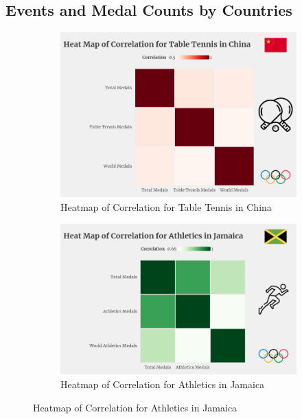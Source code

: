 \documentclass[12pt]{article}  %
\begin{document}
\subsection{Events and Medal Counts by Countries}





\begin{figure}[htbp]
	\centering
	\begin{subfigure}[b]{.3\textwidth}
		\includegraphics[width=\textwidth]{img/Table Tennis.png}
		\caption{Heatmap of Correlation for Table Tennis in China}\label{subfig:1}
	\end{subfigure}
	\hfill 
	\begin{subfigure}[b]{.33\textwidth}
		\includegraphics[width=\textwidth]{img/Jamaica.png}
		\caption{ Heatmap of Correlation for Athletics in Jamaica}\label{subfig:2}
	\end{subfigure}

\end{figure}
\end{document}
